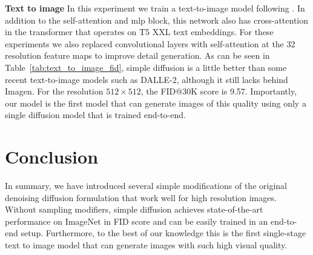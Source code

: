 \textbf{Text to image}
In this experiment we train a text-to-image model following \citep{saharia2022imagen}. In addition to the self-attention and mlp block, this network also has cross-attention in the transformer that operates on T5 XXL text embeddings. For these experiments we also replaced convolutional layers with self-attention at the 32 resolution feature maps to improve detail generation. As can be seen in Table~\ref{tab:text_to_image_fid}, simple diffusion is a little better than some recent text-to-image models such as DALLE-2, although it still lacks behind Imagen. For the resolution $512 \times 512$, the FID@30K score is 9.57. Importantly, our model is the first model that can generate images of this quality using only a single diffusion model that is trained end-to-end. 

\section{Conclusion}
In summary, we have introduced several simple modifications of the original denoising diffusion formulation that work well for high resolution images. Without sampling modifiers, simple diffusion achieves state-of-the-art performance on ImageNet in FID score and can be easily trained in an end-to-end setup. Furthermore, to the best of our knowledge this is the first single-stage text to image model that can generate images with such high visual quality.

\clearpage

\clearpage

